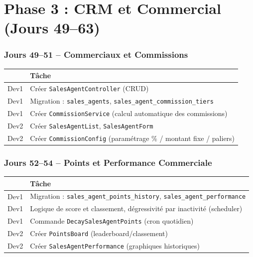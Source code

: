 \documentclass[12pt,a4paper]{report}
\begin{document}
\chapter{Phase 3 : CRM et Commercial (Jours 49--63)}

\subsection*{Jours 49--51 -- Commerciaux et Commissions}

\begin{tabularx}{\textwidth}{l X}
    \toprule
    & \textbf{Tâche} \\
    \midrule
    Dev1 & Créer \texttt{SalesAgentController} (CRUD) \\
    Dev1 & Migration : \texttt{sales\_agents}, \texttt{sales\_agent\_commission\_tiers} \\
    Dev1 & Créer \texttt{CommissionService} (calcul automatique des commissions) \\
    Dev2 & Créer \texttt{SalesAgentList}, \texttt{SalesAgentForm} \\
    Dev2 & Créer \texttt{CommissionConfig} (paramétrage \% / montant fixe / paliers) \\
    \bottomrule
\end{tabularx}

\subsection*{Jours 52--54 -- Points et Performance Commerciale}

\begin{tabularx}{\textwidth}{l X}
    \toprule
    & \textbf{Tâche} \\
    \midrule
    Dev1 & Migration : \texttt{sales\_agent\_points\_history}, \texttt{sales\_agent\_performance} \\
    Dev1 & Logique de score et classement, dégressivité par inactivité (scheduler) \\
    Dev1 & Commande \texttt{DecaySalesAgentPoints} (cron quotidien) \\
    Dev2 & Créer \texttt{PointsBoard} (leaderboard/classement) \\
    Dev2 & Créer \texttt{SalesAgentPerformance} (graphiques historiques) \\
    \bottomrule
\end{tabularx}
\end{document}
